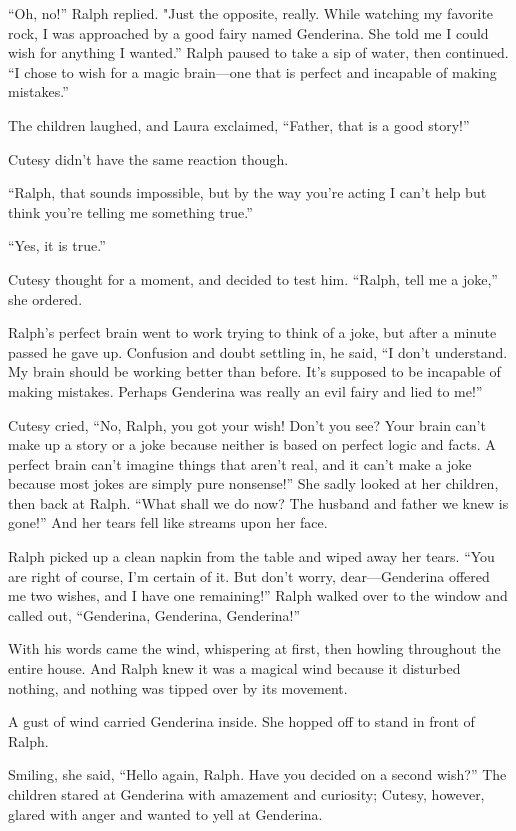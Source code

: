 “Oh, no!” Ralph replied. "Just the opposite, really. While watching my favorite rock, I was approached by a good fairy named Genderina. She told me I could wish for anything I wanted.” Ralph paused to take a sip of water, then continued. “I chose to wish for a magic brain—one that is perfect and incapable of making mistakes.”

The children laughed, and Laura exclaimed, “Father, that is a good story!”

Cutesy didn't have the same reaction though.

“Ralph, that sounds impossible, but by the way you're acting I can't help but think you're telling me something true.”

“Yes, it is true.”

Cutesy thought for a moment, and decided to test him. “Ralph, tell me a joke,” she ordered.

Ralph's perfect brain went to work trying to think of a joke, but after a minute passed he gave up. Confusion and doubt settling in, he said, “I don't understand. My brain should be working better than before. It's supposed to be incapable of making mistakes. Perhaps Genderina was really an evil fairy and lied to me!”

Cutesy cried, “No, Ralph, you got your wish! Don't you see? Your brain can't make up a story or a joke because neither is based on perfect logic and facts. A perfect brain can't imagine things that aren't real, and it can't make a joke because most jokes are simply pure nonsense!” She sadly looked at her children, then back at Ralph. “What shall we do now? The husband and father we knew is gone!” And her tears fell like streams upon her face.

Ralph picked up a clean napkin from the table and wiped away her tears. “You are right of course, I'm certain of it. But don't worry, dear—Genderina offered me two wishes, and I have one remaining!” Ralph walked over to the window and called out, “Genderina, Genderina, Genderina!”

With his words came the wind, whispering at first, then howling throughout the entire house. And Ralph knew it was a magical wind because it disturbed nothing, and nothing was tipped over by its movement.

A gust of wind carried Genderina inside. She hopped off to stand in front of Ralph.

Smiling, she said, “Hello again, Ralph. Have you decided on a second wish?” The children stared at Genderina with amazement and curiosity; Cutesy, however, glared with anger and wanted to yell at Genderina.

